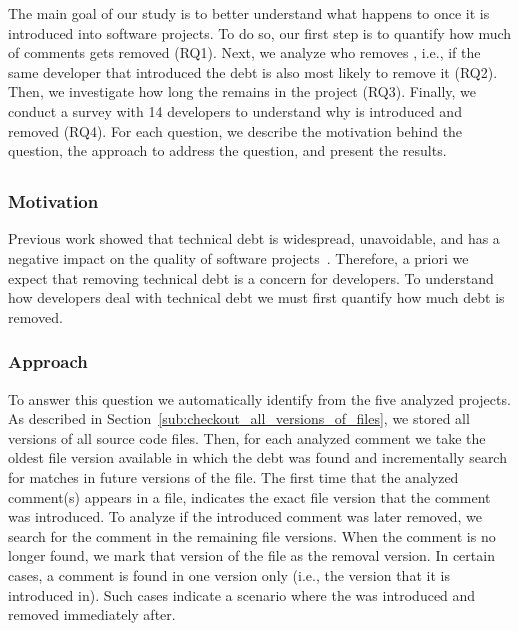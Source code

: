 
The main goal of our study is to better understand what happens to \SATD once it is introduced into software projects. To do so, our first step is to quantify how much of \SATD comments gets removed (RQ1). Next, we analyze who removes \SATD, i.e., if the same developer that introduced the debt is also most likely to remove it (RQ2). Then, we investigate how long the \SATD remains in the project (RQ3). Finally, we conduct a survey with 14 developers to understand why \SATD is introduced and removed (RQ4). For each question, we describe the motivation behind the question, the approach to address the question, and present the results.



\subsection*{\rqi}
\subsubsection*{Motivation} Previous work showed that technical debt is widespread, unavoidable, and has a negative impact on the quality of software projects~\cite{Lim2012Software}. Therefore, a priori we expect that removing technical debt is a concern for developers. To understand how developers deal with  technical debt we must first quantify how much debt is removed. 


\subsubsection*{Approach} To answer this question we automatically identify \SATD from the five analyzed projects. As described in Section~\ref{sub:checkout_all_versions_of_files}, we stored all versions of all source code files. Then, for each analyzed \SATD comment we take the oldest file version available in which the debt was found and incrementally search for matches in future versions of the file. The first time that the analyzed \SATD comment(s) appears in a file, indicates the exact file version that the \SATD comment was introduced. To analyze if the introduced \SATD comment was later removed, we search for the comment in the remaining file versions. When the comment is no longer found, we mark that version of the file as the removal version. In certain cases, a \SATD comment is found in one version only (i.e., the version that it is introduced in). Such cases indicate a scenario where the \SATD was introduced and removed immediately after. 

